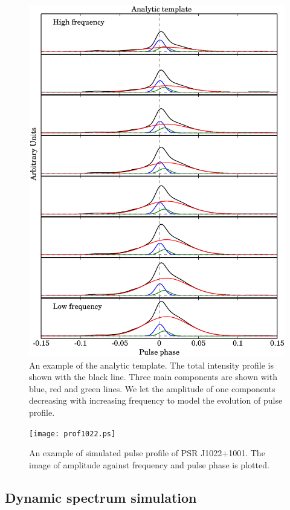 \documentclass[useAMS,usenatbib]{mn2e}
\begin{document}
\begin{figure}
\center
\includegraphics[width=3.5 in]{template.ps}
\caption{An example of the analytic template. The total intensity profile is shown with the 
black line. Three main components are shown with blue, red and green lines. We let the 
amplitude of one components decreasing with increasing frequency to model the evolution 
of pulse profile.} 
\label{template}
\end{figure}

\begin{figure}
\center
\texttt{[image: prof1022.ps]}
\caption{An example of simulated pulse profile of PSR J1022$+$1001. The image of amplitude 
against frequency and pulse phase is plotted. } 
\label{1022prof}
\end{figure}

\subsection{Dynamic spectrum simulation}
\end{document}

